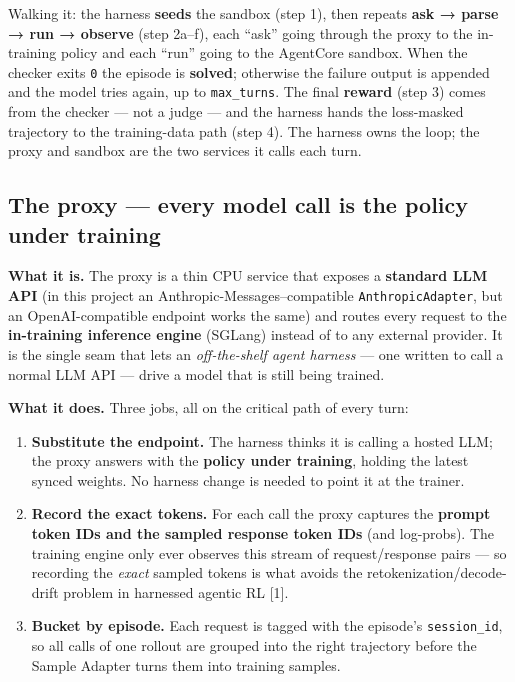 \documentclass[
  paper=a4,
  ,captions=tableheading
]{scrartcl}
\providecommand{\tightlist}{%
  \setlength{\itemsep}{0pt}\setlength{\parskip}{0pt}}
\begin{document}
Walking it: the harness \textbf{seeds} the sandbox (step 1), then
repeats \textbf{ask → parse → run → observe} (step 2a--f), each ``ask''
going through the proxy to the in-training policy and each ``run'' going
to the AgentCore sandbox. When the checker exits \texttt{0} the episode
is \textbf{solved}; otherwise the failure output is appended and the
model tries again, up to \texttt{max\_turns}. The final \textbf{reward}
(step 3) comes from the checker --- not a judge --- and the harness
hands the loss-masked trajectory to the training-data path (step 4). The
harness owns the loop; the proxy and sandbox are the two services it
calls each turn.

\hypertarget{the-proxy-every-model-call-is-the-policy-under-training}{%
\subsection{The proxy --- every model call is the policy under
training}\label{the-proxy-every-model-call-is-the-policy-under-training}}

\textbf{What it is.} The proxy is a thin CPU service that exposes a
\textbf{standard LLM API} (in this project an
Anthropic-Messages--compatible \texttt{AnthropicAdapter}, but an
OpenAI-compatible endpoint works the same) and routes every request to
the \textbf{in-training inference engine} (SGLang) instead of to any
external provider. It is the single seam that lets an
\emph{off-the-shelf agent harness} --- one written to call a normal LLM
API --- drive a model that is still being trained.

\textbf{What it does.} Three jobs, all on the critical path of every
turn:

\begin{enumerate}
\def\labelenumi{\arabic{enumi}.}
\tightlist
\item
  \textbf{Substitute the endpoint.} The harness thinks it is calling a
  hosted LLM; the proxy answers with the \textbf{policy under training},
  holding the latest synced weights. No harness change is needed to
  point it at the trainer.
\item
  \textbf{Record the exact tokens.} For each call the proxy captures the
  \textbf{prompt token IDs and the sampled response token IDs} (and
  log-probs). The training engine only ever observes this stream of
  request/response pairs --- so recording the \emph{exact} sampled
  tokens is what avoids the retokenization/decode-drift problem in
  harnessed agentic RL {[}1{]}.
\item
  \textbf{Bucket by episode.} Each request is tagged with the episode's
  \texttt{session\_id}, so all calls of one rollout are grouped into the
  right trajectory before the Sample Adapter turns them into training
  samples.
\end{enumerate}
\end{document}
